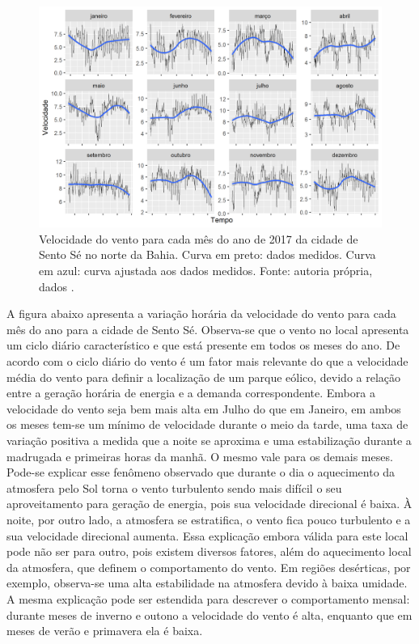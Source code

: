 \documentclass[
	12pt,				%
	openright,			%
	oneside,			%
	a4paper,			%
	english,			%
	french,				%
	spanish,			%
	brazil				%
	]{abntex2}
\begin{document}
\begin{figure}[h]
    \centering
	\includegraphics[scale=0.85]{stochastic_monthly}
	\caption{Velocidade do vento para cada mês do ano de 2017 da cidade de Sento Sé no norte da Bahia. Curva em preto: dados medidos. Curva em azul: curva ajustada aos dados medidos. Fonte: autoria própria, dados \cite{era5}.}
\end{figure}
\FloatBarrier

A figura abaixo apresenta a variação horária da velocidade do vento para cada mês do ano para a cidade de Sento Sé.
Observa-se que o vento no local apresenta um ciclo diário característico e que está presente em todos os meses do ano. De acordo com \cite{art10} o ciclo diário do vento é um fator mais relevante do que a velocidade média do vento para definir a localização de um parque eólico, devido a relação entre a geração horária de energia e a demanda correspondente. Embora a velocidade do vento seja bem mais alta em Julho do que em Janeiro, em ambos os meses tem-se um mínimo de velocidade durante o meio da tarde, uma taxa de variação positiva a medida que a noite se aproxima e uma estabilização durante a madrugada e primeiras horas da manhã. O mesmo vale para os demais meses.
Pode-se explicar esse fenômeno observado que durante o dia o aquecimento da atmosfera pelo Sol torna o vento turbulento sendo mais difícil o seu aproveitamento para geração de energia, pois sua velocidade direcional é baixa. À noite, por outro lado, a atmosfera se estratifica, o vento fica pouco turbulento e a sua velocidade direcional aumenta. Essa explicação embora válida para este local pode não ser para outro, pois existem diversos fatores, além do aquecimento local da atmosfera, que definem o comportamento do vento. Em regiões desérticas, por exemplo, observa-se uma alta estabilidade na atmosfera devido à baixa umidade. A mesma explicação pode ser estendida para descrever o comportamento mensal: durante meses de inverno e outono a velocidade do vento é alta, enquanto que em meses de verão e primavera ela é baixa. 
\end{document}
